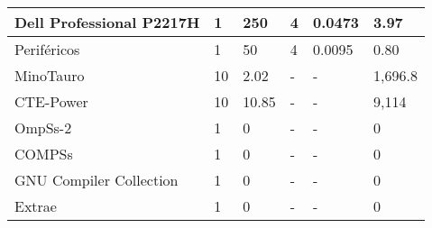 \begin{longtable}{l|l|l|l|l|l|}
\multicolumn{1}{|l|}{Dell Professional P2217H}                                                                                      & 1                               & 250                     & 4                       & 0.0473                  & 3.97                            \\ \hline
\multicolumn{1}{|l|}{Periféricos}                                                                                                   & 1                               & 50                      & 4                       & 0.0095                  & 0.80                            \\ \hline
\multicolumn{1}{|l|}{MinoTauro}                                                                                                     & 10                              & 2.02                    & -                       & -                       & 1,696.8                          \\ \hline
\multicolumn{1}{|l|}{CTE-Power}                                                                                                     & 10                              & 10.85                   & -                       & -                       & 9,114                            \\ \hline
\multicolumn{1}{|l|}{OmpSs-2}                                                                                                       & 1                               & 0                       & -                       & -                       & 0                               \\ \hline
\multicolumn{1}{|l|}{COMPSs}                                                                                                        & 1                               & 0                       & -                       & -                       & 0                               \\ \hline
\multicolumn{1}{|l|}{GNU Compiler Collection}                                                                                       & 1                               & 0                       & -                       & -                       & 0                               \\ \hline
\multicolumn{1}{|l|}{Extrae}                                                                                                        & 1                               & 0                       & -                       & -                       & 0                               \\ \hline

\end{longtable}
